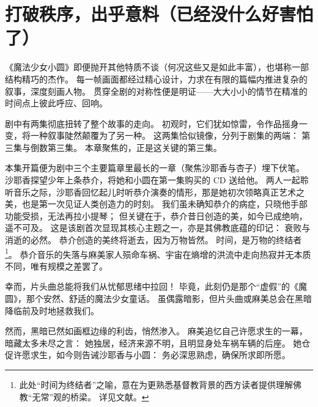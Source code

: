 \chapter[打破秩序，出乎意料（已经没什么好害怕了）]{打破秩序，出乎意料\protect\footnotemark（已经没什么好害怕了）}


《魔法少女小圆》即便抛开其他特质不谈（何况这些又是如此丰富），也堪称一部结构精巧的杰作。
每一帧画面都经过精心设计，力求在有限的篇幅内推进复杂的叙事，深度刻画人物。
贯穿全剧的对称性便是明证——大大小小的情节在精准的时间点上彼此呼应、回响。

剧中有两集彻底扭转了整个故事的走向。
初观时，它们犹如惊雷，令作品摇身一变，将一种叙事陡然颠覆为了另一种。
这两集恰似镜像，分列于剧集的两端：
第三集与倒数第三集。
本章聚焦的，正是这关键的第三集。

本集开篇便为剧中三个主要篇章里最长的一章（聚焦沙耶香与杏子）埋下伏笔。
沙耶香探望少年上条恭介，将她和小圆在第一集购买的 CD 送给他。
两人一起聆听音乐之际，沙耶香回忆起儿时听恭介演奏的情形，那是她初次领略真正艺术之美，也是第一次见证人类创造力的时刻。
我们虽未确知恭介的病症，只晓他手部功能受损，无法再拉小提琴；
但关键在于，恭介昔日创造的美，如今已成绝响，遥不可及。
这是该剧首次显现其核心主题之一，亦是其佛教底蕴的印记：
衰败与消逝的必然。
恭介创造的美终将逝去，因为万物皆然。
时间，是万物的终结者\footnote{%
    此处“时间为终结者”之喻，意在为更熟悉基督教背景的西方读者提供理解佛教“无常”观的桥梁。
    详见文献\cite{ref25}。
}。
恭介音乐的失落与麻美家人殒命车祸、宇宙在熵增的洪流中走向热寂并无本质不同，唯有规模之差罢了。

幸而，片头曲总能将我们从忧郁思绪中拉回！
毕竟，此刻仍是那个“虚假”的《魔圆》，那个安然、舒适的魔法少女童话。
虽偶露暗影，但片头曲或麻美总会在黑暗降临前及时地拯救我们。

然而，黑暗已然如画框边缘的利齿，悄然渗入。
麻美追忆自己许愿求生的一幕，暗藏太多未尽之言：
她独居，经济来源不明，且明显身处车祸车辆的后座。
她仓促许愿求生，如今则告诫沙耶香与小圆：
务必深思熟虑，确保所求即所愿。

